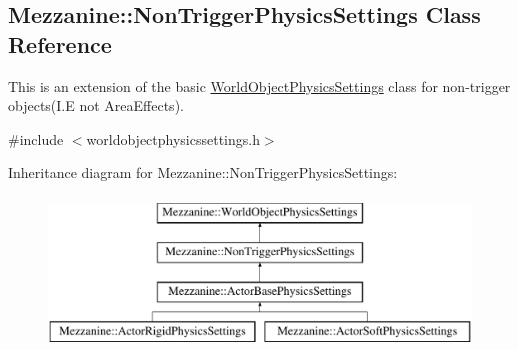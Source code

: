 \hypertarget{classMezzanine_1_1NonTriggerPhysicsSettings}{
\subsection{Mezzanine::NonTriggerPhysicsSettings Class Reference}
\label{classMezzanine_1_1NonTriggerPhysicsSettings}
}


This is an extension of the basic \hyperlink{classMezzanine_1_1WorldObjectPhysicsSettings}{WorldObjectPhysicsSettings} class for non-\/trigger objects(I.E not AreaEffects).  




{\ttfamily \#include $<$worldobjectphysicssettings.h$>$}

Inheritance diagram for Mezzanine::NonTriggerPhysicsSettings:\begin{figure}[H]
\begin{center}
\leavevmode
\includegraphics[height=4.000000cm]{classMezzanine_1_1NonTriggerPhysicsSettings}
\end{center}
\end{figure}
